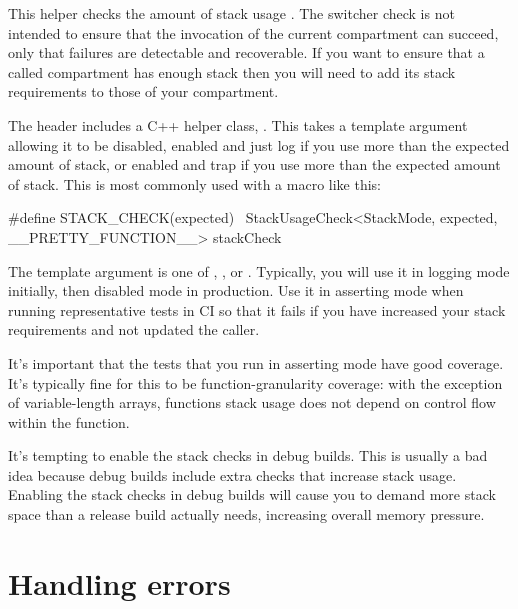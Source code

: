 
\begin{note}
This helper checks the amount of stack usage .
The switcher check is not intended to ensure that the invocation of the current compartment can succeed, only that failures are detectable and recoverable.
If you want to ensure that a called compartment  has enough stack then you will need to add its stack requirements to those of your compartment.
\end{note}

The  header includes a C++ helper class, .
This takes a template argument allowing it to be disabled, enabled and just log if you use more than the expected amount of stack, or enabled and trap if you use more than the expected amount of stack.
This is most commonly used with a macro like this:

\begin{cxxsnippet}
#define STACK_CHECK(expected) \ 
       StackUsageCheck<StackMode, expected, __PRETTY_FUNCTION__> stackCheck
\end{cxxsnippet}

The  template argument is one of , , or .
Typically, you will use it in logging mode initially, then disabled mode in production.
Use it in asserting mode when running representative tests in CI so that it fails if you have increased your stack requirements and not updated the caller.

It's important that the tests that you run in asserting mode have good coverage.
It's typically fine for this to be function-granularity coverage: with the exception of variable-length arrays, functions stack usage does not depend on control flow within the function.

\begin{caution}
It's tempting to enable the stack checks in debug builds.
This is usually a bad idea because debug builds include extra checks that increase stack usage.
Enabling the stack checks in debug builds will cause you to demand more stack space than a release build actually needs, increasing overall memory pressure.
\end{caution}

\section[label=handling_errors]{Handling errors}


